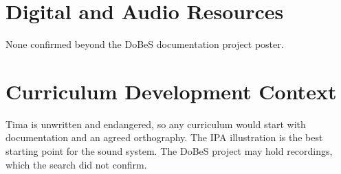 \documentclass[12pt]{article}
\begin{document}
\section{Digital and Audio Resources}
None confirmed beyond the DoBeS documentation project poster.

\section{Curriculum Development Context}
Tima is unwritten and endangered, so any curriculum would start with documentation and an agreed orthography. The IPA illustration is the best starting point for the sound system. The DoBeS project may hold recordings, which the search did not confirm.
\end{document}
